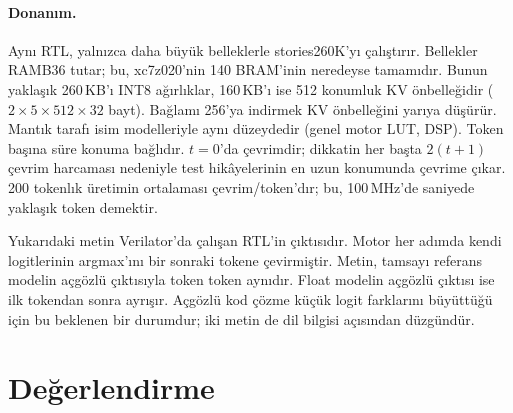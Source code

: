 \paragraph{Donanım.} Aynı RTL, yalnızca daha büyük belleklerle stories260K'yı çalıştırır. Bellekler \zooStoriesGenBram{} RAMB36 tutar; bu, xc7z020'nin 140 BRAM'inin neredeyse tamamıdır. Bunun yaklaşık 260\,KB'ı INT8 ağırlıklar, 160\,KB'ı ise 512 konumluk KV önbelleğidir ($2 \times 5 \times 512 \times 32$ bayt). Bağlamı 256'ya indirmek KV önbelleğini yarıya düşürür. Mantık tarafı isim modelleriyle aynı düzeydedir (genel motor \zooStoriesGenLut{} LUT, \zooStoriesGenDsp{} DSP). Token başına süre konuma bağlıdır. $t=0$'da \zooStoriesCycMin{} çevrimdir; dikkatin her başta $2(t+1)$ çevrim harcaması nedeniyle test hikâyelerinin en uzun konumunda \zooStoriesCycMax{} çevrime çıkar. 200 tokenlık üretimin ortalaması \zooStoriesGenCyc{} çevrim/token'dır; bu, 100\,MHz'de saniyede yaklaşık \zooStoriesTps{} token demektir.

\begin{ozet}
\small\itshape

\end{ozet}

Yukarıdaki metin Verilator'da çalışan RTL'in çıktısıdır. Motor her adımda kendi logitlerinin argmax'ını bir sonraki tokene çevirmiştir. Metin, tamsayı referans modelin açgözlü çıktısıyla token token aynıdır. Float modelin açgözlü çıktısı ise ilk \zooStoriesSame{} tokendan sonra ayrışır. Açgözlü kod çözme küçük logit farklarını büyüttüğü için bu beklenen bir durumdur; iki metin de dil bilgisi açısından düzgündür.

\section{Değerlendirme}\label{sec:tartisma}

